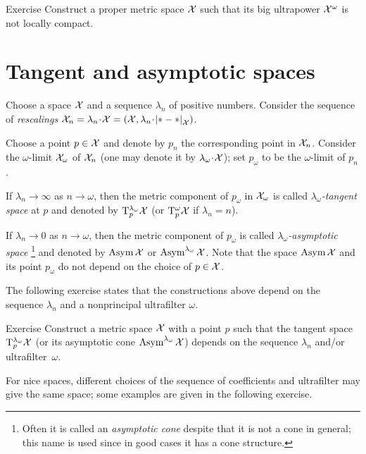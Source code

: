 \begin{thm}{Exercise}\label{ex:notproper-limit}
Construct a proper metric space $\mathcal{X}$ such that its big ultrapower $\mathcal{X}^\omega$ is not locally compact.
\end{thm}

\section{Tangent and asymptotic spaces}
\label{sec:tan+asymptotic}

Choose a space $\mathcal{X}$ and a sequence $\lambda_n$ of positive numbers.
Consider the sequence of \emph{rescalings} $\spc{X}_n=\lambda_n\cdot\spc{X}=(\spc{X},\lambda_n\cdot\dist{*}{*}{\spc{X}})$.

Choose a point $p\in \mathcal{X}$ and denote by $p_n$ the corresponding point in $\mathcal{X}_n$.
Consider the $\omega$-limit $\mathcal{X}_\omega$ of $\mathcal{X}_n$ (one may denote it by $\lambda_\omega\cdot \spc{X}$);
set $p_\omega$ to be the $\omega$-limit of $p_n$.

If $\lambda_n\to \infty$ as $n\to\omega$, then the metric component of $p_\omega$ in $\mathcal{X}_\omega$ is called \emph{$\lambda_\omega$-tangent space} at $p$ and denoted by $\mathrm{T}_p^{\lambda_\omega}\mathcal{X}$ (or $\mathrm{T}_p^{\omega}\mathcal{X}$ if $\lambda_n=n$).\label{page:ultratangent space}

If $\lambda_n\to 0$ as $n\to\omega$, then the metric component of $p_\omega$ is called \emph{$\lambda_\omega$-asymptotic space}%
\footnote{Often it is called an \textit{asymptotic cone} despite that it is not a cone in general; this name is used since in good cases it has a cone structure.} and denoted by $\mathop{\rm Asym}\nolimits\mathcal{X}$ or $\mathop{\rm Asym}\nolimits^{\lambda_\omega}\mathcal{X}$.
Note that the space $\mathop{\rm Asym}\nolimits\mathcal{X}$ and its point $p_\omega$ do not depend on the choice of $p\in \mathcal{X}$.

The following exercise states that the constructions above depend on the sequence $\lambda_n$ and a nonprincipal ultrafilter $\omega$.

\begin{thm}{Exercise}\label{ex:ultraT}
Construct a metric space $\mathcal{X}$ with a point $p$ such that the tangent space
$\mathrm{T}_p^{\lambda_\omega}\mathcal{X}$ (or its asymptotic cone $\mathop{\rm Asym}\nolimits^{\lambda_\omega}\mathcal{X}$) depends on the sequence $\lambda_n$ and/or ultrafilter~$\omega$.
\end{thm}

For nice spaces, different choices of the sequence of coefficients and ultrafilter may give the same space; 
some examples are given in the following exercise.

